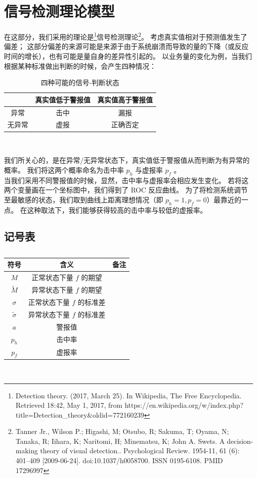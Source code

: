 \documentclass[a4paper]{article}
\begin{document}
\section{信号检测理论模型}
在这部分，我们采用的理论是\footnote{Detection theory. (2017, March 25). In Wikipedia, The Free Encyclopedia. Retrieved 18:42, May 1, 2017, from https://en.wikipedia.org/w/index.php?title=Detection\_theory\&oldid=772160239}信号检测理论\footnote{Tanner Jr., Wilson P.; Higashi, M; Otsubo, R; Sakuma, T; Oyama, N; Tanaka, R; Iihara, K; Naritomi, H; Minematsu, K; John A. Swets. A decision-making theory of visual detection.. Psychological Review. 1954-11, 61 (6): 401–409 [2009-06-24]. doi:10.1037/h0058700. ISSN 0195-6108. PMID 17296997}。
考虑真实值相对于预测值发生了偏差；
这部分偏差的来源可能是来源于由于系统崩溃而导致的量的下降（或反应时间的增长），也有可能是量自身的差异性引起的。
以业务量的变化为例，当我们根据某种标准做出判断的时候，会产生四种情况：
\begin{table}[H]
	\centering
	\caption{四种可能的信号-判断状态}
	\label{tab:sdt-four}
	\begin{tabular}{|c|c|c|}
		\hline
		 & 真实值低于警报值 & 真实值高于警报值 \\
		\hline
		异常 & 击中 & 漏报 \\
		\hline
		无异常 & 虚报 & 正确否定 \\
		\hline
	\end{tabular} \\
\end{table}
我们所关心的，是在异常/无异常状态下，真实值低于警报值从而判断为有异常的概率。
我们将这两个概率命名为击中率 $p_h$ 与虚报率 $p_f$ 。
\\
\indent 当我们采用不同警报值的时候，显然，击中率与虚报率会相应发生变化。
若将这两个变量画在一个坐标图中，我们得到了 ROC 反应曲线。
为了将检测系统调节至最敏感的状态，我们取到曲线上距离理想情况（即 $p_h = 1, p_f = 0$）最靠近的一点。
在这种取法下，我们能够获得较高的击中率与较低的虚报率。
\subsection*{记号表}
\begin{table}[H]
	\centering
	\caption{}
	\label{tab:sdt_symbols}
	\begin{tabular}{ccc}
		\hline
		符号 & 含义 & 备注 \\
		\hline
		$M$ & 正常状态下量 $f$ 的期望 & \\
		$\tilde{M}$ & 异常状态下量 $f$ 的期望 & \\
		$\sigma$ & 正常状态下量 $f$ 的标准差 & \\
		$\tilde{\sigma}$ & 异常状态下量 $f$ 的标准差 & \\
		$a$ & 警报值 & \\
		$p_h$ & 击中率 & \\
		$p_f$ & 虚报率 & \\
		\hline
	\end{tabular} \\
\end{table}
\end{document}
